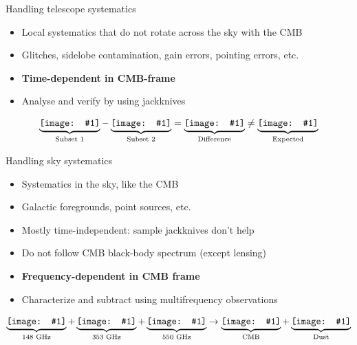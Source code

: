 \documentclass{beamer}
\newcommand*{\mimg}[2]{\begingroup
\setbox0=\hbox{\texttt{[image: \#1]}}\parbox{\wd0}{\box0}\endgroup}
\begin{document}
\begin{frame}{Handling telescope systematics}
	\begin{itemize}
		\item Local systematics that do not rotate across the sky with the CMB
		\item Glitches, sidelobe contamination, gain errors, pointing errors, etc.
		\item {\bf Time-dependent in CMB-frame}
		\item Analyse and verify by using jackknives
	\end{itemize}
	\[
		\underbrace{\mimg{out_dirty/null1_0.png}{2.0cm}}_{\textrm{Subset 1}} -
		\underbrace{\mimg{out_dirty/null1_1.png}{2.0cm}}_{\textrm{Subset 2}} =
		\underbrace{\mimg{out_dirty/null1_2.png}{2.0cm}}_{\textrm{Difference}} \ne
		\underbrace{\mimg{out_dirty/null1_3.png}{2.0cm}}_{\textrm{Expected}}
	\]
\end{frame}

\begin{frame}{Handling sky systematics}
	\begin{itemize}
		\item Systematics in the sky, like the CMB
		\item Galactic foregrounds, point sources, etc.
		\item Mostly time-independent: sample jackknives don't help
		\item Do not follow CMB black-body spectrum (except lensing)
		\item {\bf Frequency-dependent in CMB frame}
		\item Characterize and subtract using multifrequency observations
	\end{itemize}
	\[
		\underbrace{\mimg{out_dirty/null2_0.png}{1.8cm}}_{\textrm{148 GHz}} +
		\underbrace{\mimg{out_dirty/null2_1.png}{1.8cm}}_{\textrm{353 GHz}} +
		\underbrace{\mimg{out_dirty/null2_2.png}{1.8cm}}_{\textrm{550 GHz}} \rightarrow
		\underbrace{\mimg{out_dirty/null2_3.png}{1.8cm}}_{\textrm{CMB}} +
		\underbrace{\mimg{out_dirty/null2_4.png}{1.8cm}}_{\textrm{Dust}}
	\]
\end{frame}
\end{document}
